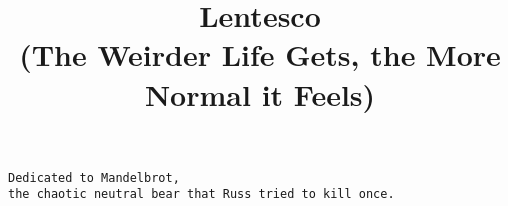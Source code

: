 \documentclass[12pt]{report}
\title{\textbf{Lentesco} \\ \vspace{1em} 
\small{(The Weirder Life Gets, the More Normal it Feels)}}
\begin{document}
\maketitle
\newpage \vspace*{6cm}
\thispagestyle{empty}
\begin{center}
\texttt{Dedicated to Mandelbrot, \\ the chaotic neutral bear
that Russ tried to kill once.}
\end{center}




\end{document}
